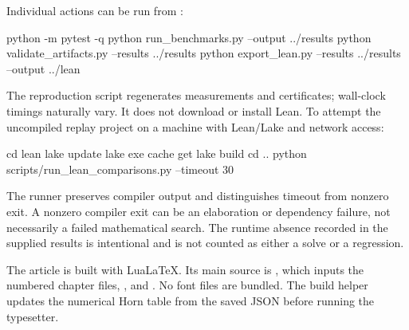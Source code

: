 Individual actions can be run from :
\begin{Code}
python -m pytest -q
python run_benchmarks.py --output ../results
python validate_artifacts.py --results ../results
python export_lean.py --results ../results --output ../lean
\end{Code}

The reproduction script regenerates measurements and certificates; wall-clock
timings naturally vary. It does not download or install Lean. To attempt the
uncompiled replay project on a machine with Lean/Lake and network access:
\begin{Code}
cd lean
lake update
lake exe cache get
lake build
cd ..
python scripts/run_lean_comparisons.py --timeout 30
\end{Code}

The runner preserves compiler output and distinguishes timeout from nonzero
exit. A nonzero compiler exit can be an elaboration or dependency failure,
not necessarily a failed mathematical search. The runtime absence recorded in
the supplied results is intentional and is not counted as either a solve or
a regression.

The article is built with LuaLaTeX. Its main source is
, which inputs the numbered chapter files,
, and . No font files are bundled.
The build helper updates the numerical Horn table from the saved JSON before
running the typesetter.
